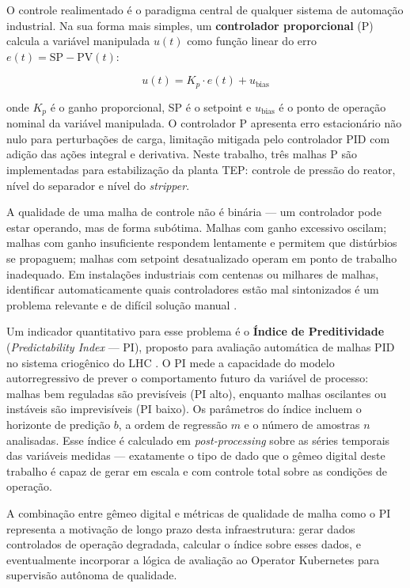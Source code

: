 O controle realimentado é o paradigma central de qualquer sistema de automação industrial. Na sua forma mais simples, um \textbf{controlador proporcional} (P) calcula a variável manipulada $u(t)$ como função linear do erro $e(t) = \text{SP} - \text{PV}(t)$:

\begin{equation}
  u(t) = K_p \cdot e(t) + u_{\text{bias}}
  \label{eq:p_controller}
\end{equation}

\noindent onde $K_p$ é o ganho proporcional, SP é o setpoint e $u_{\text{bias}}$ é o ponto de operação nominal da variável manipulada. O controlador P apresenta erro estacionário não nulo para perturbações de carga, limitação mitigada pelo controlador PID com adição das ações integral e derivativa. Neste trabalho, três malhas P são implementadas para estabilização da planta TEP: controle de pressão do reator, nível do separador e nível do \textit{stripper}.

A qualidade de uma malha de controle não é binária — um controlador pode estar operando, mas de forma subótima. Malhas com ganho excessivo oscilam; malhas com ganho insuficiente respondem lentamente e permitem que distúrbios se propaguem; malhas com setpoint desatualizado operam em ponto de trabalho inadequado. Em instalações industriais com centenas ou milhares de malhas, identificar automaticamente quais controladores estão mal sintonizados é um problema relevante e de difícil solução manual \cite{CERN_WEAPL02}.

Um indicador quantitativo para esse problema é o \textbf{Índice de Preditividade} (\textit{Predictability Index} — PI), proposto para avaliação automática de malhas PID no sistema criogênico do LHC \cite{CERN_WEAPL02}. O PI mede a capacidade do modelo autorregressivo de prever o comportamento futuro da variável de processo: malhas bem reguladas são previsíveis (PI alto), enquanto malhas oscilantes ou instáveis são imprevisíveis (PI baixo). Os parâmetros do índice incluem o horizonte de predição $b$, a ordem de regressão $m$ e o número de amostras $n$ analisadas. Esse índice é calculado em \textit{post-processing} sobre as séries temporais das variáveis medidas — exatamente o tipo de dado que o gêmeo digital deste trabalho é capaz de gerar em escala e com controle total sobre as condições de operação.

A combinação entre gêmeo digital e métricas de qualidade de malha como o PI representa a motivação de longo prazo desta infraestrutura: gerar dados controlados de operação degradada, calcular o índice sobre esses dados, e eventualmente incorporar a lógica de avaliação ao Operator Kubernetes para supervisão autônoma de qualidade.

